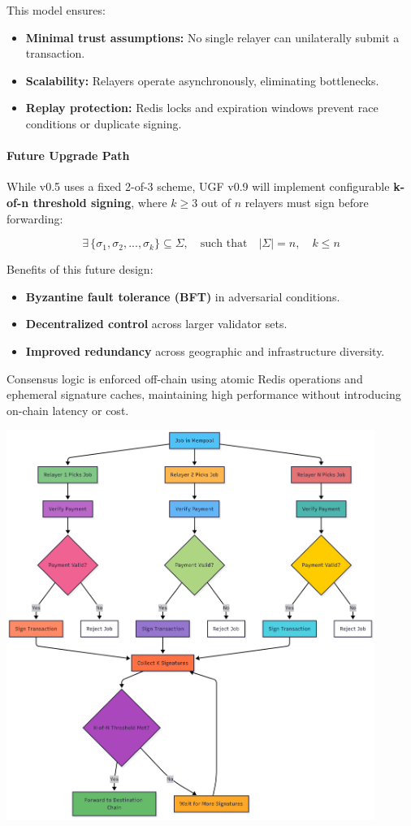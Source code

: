 \documentclass{article}
\begin{document}
This model ensures:
\begin{itemize}
  \item \textbf{Minimal trust assumptions:} No single relayer can unilaterally submit a transaction.
  \item \textbf{Scalability:} Relayers operate asynchronously, eliminating bottlenecks.
  \item \textbf{Replay protection:} Redis locks and expiration windows prevent race conditions or duplicate signing.
\end{itemize}

\paragraph{Future Upgrade Path}

While v0.5 uses a fixed 2-of-3 scheme, UGF v0.9 will implement configurable \textbf{k-of-n threshold signing}, where \( k \geq 3 \) out of \( n \) relayers must sign before forwarding:

\[
\exists \, \{ \sigma_1, \sigma_2, ..., \sigma_k \} \subseteq \Sigma, \quad \text{such that} \quad |\Sigma| = n, \quad k \leq n
\]

Benefits of this future design:
\begin{itemize}
  \item \textbf{Byzantine fault tolerance (BFT)} in adversarial conditions.
  \item \textbf{Decentralized control} across larger validator sets.
  \item \textbf{Improved redundancy} across geographic and infrastructure diversity.
\end{itemize}

Consensus logic is enforced off-chain using atomic Redis operations and ephemeral signature caches, maintaining high performance without introducing on-chain latency or cost.

\includegraphics[width=0.9\textwidth]{images/consensus-relayers.png}
\end{document}
